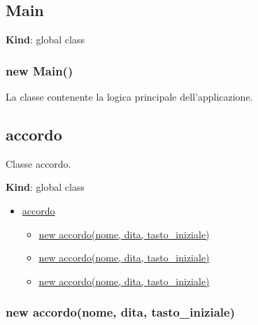 \protect\hypertarget{Main}{}{}

\hypertarget{main}{%
\subsection{Main}\label{main}}

\textbf{Kind}: global class\\
\protect\hypertarget{new_Main_new}{}{}

\hypertarget{new-main}{%
\subsubsection{new Main()}\label{new-main}}

La classe contenente la logica principale dell'applicazione.

\protect\hypertarget{accordo}{}{}

\hypertarget{accordo}{%
\subsection{accordo}\label{accordo}}

Classe accordo.

\textbf{Kind}: global class

\begin{itemize}
\tightlist
\item
  \protect\hyperlink{accordo}{accordo}

  \begin{itemize}
  \tightlist
  \item
    \protect\hyperlink{new_accordo_new}{new accordo(nome, dita,
    tasto\_iniziale)}
  \item
    \protect\hyperlink{new_accordo_new}{new accordo(nome, dita,
    tasto\_iniziale)}
  \item
    \protect\hyperlink{new_accordo_new}{new accordo(nome, dita,
    tasto\_iniziale)}
  \end{itemize}
\end{itemize}

\protect\hypertarget{new_accordo_new}{}{}

\hypertarget{new-accordonome-dita-tasto_iniziale}{%
\subsubsection{new accordo(nome, dita,
tasto\_iniziale)}\label{new-accordonome-dita-tasto_iniziale}}

